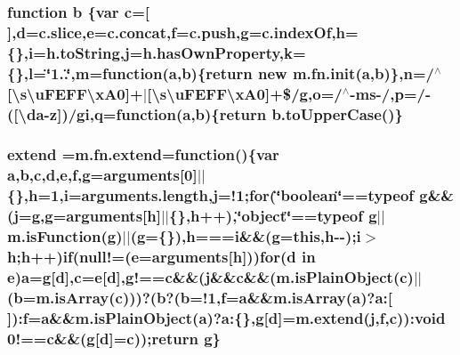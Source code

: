 \subsubsection[{b}]{\setlength{\rightskip}{0pt plus 5cm}function b \{var {\bf c}=\mbox{[}$\,$\mbox{]},{\bf d}=c.\+slice,{\bf e}=c.\+concat,f=c.\+push,g=c.\+index\+Of,h=\{\},i=h.\+to\+String,j=h.\+has\+Own\+Property,k=\{\},l=\char`\"{}1..\char`\"{},m=function({\bf a},b)\{return new m.\+fn.\+init({\bf a},b)\},{\bf n}=/$^\wedge$\mbox{[}\textbackslash{}s\textbackslash{}u\+F\+E\+F\+F\textbackslash{}x\+A0\mbox{]}+$\vert$\mbox{[}\textbackslash{}s\textbackslash{}u\+F\+E\+F\+F\textbackslash{}x\+A0\mbox{]}+\$/g,o=/$^\wedge$-\/ms-\//,p=/-\/(\mbox{[}\textbackslash{}da-\/z\mbox{]})/gi,q=function({\bf a},b)\{return b.\+to\+Upper\+Case()\}}\label{assets_2js_2jquery-1_811_82_8min_8js_ac0431efac4d7c393d1e70b86115cb93f}
\hypertarget{assets_2js_2jquery-1_811_82_8min_8js_a97d2dfc7eacd4130836f6cf8b6766d1e}{}
\subsubsection[{extend}]{\setlength{\rightskip}{0pt plus 5cm}extend =m.\+fn.\+extend=function()\{var {\bf a},{\bf b},{\bf c},{\bf d},{\bf e},f,g=arguments\mbox{[}0\mbox{]}$\vert$$\vert$\{\},h=1,i=arguments.\+length,j=!1;{\bf for}(\char`\"{}boolean\char`\"{}==typeof g\&\&(j=g,g=arguments\mbox{[}h\mbox{]}$\vert$$\vert$\{\},h++),\char`\"{}object\char`\"{}==typeof g$\vert$$\vert$m.\+is\+Function(g)$\vert$$\vert$(g=\{\}),h===i\&\&(g=this,h-\/-\/);i$>$h;h++){\bf if}(null!=({\bf e}=arguments\mbox{[}h\mbox{]})){\bf for}({\bf d} in {\bf e}){\bf a}=g\mbox{[}{\bf d}\mbox{]},{\bf c}={\bf e}\mbox{[}{\bf d}\mbox{]},g!=={\bf c}\&\&(j\&\&{\bf c}\&\&(m.\+is\+Plain\+Object({\bf c})$\vert$$\vert$({\bf b}=m.\+is\+Array({\bf c})))?({\bf b}?({\bf b}=!1,f={\bf a}\&\&m.\+is\+Array({\bf a})?a\+:\mbox{[}$\,$\mbox{]})\+:f={\bf a}\&\&m.\+is\+Plain\+Object({\bf a})?a\+:\{\},g\mbox{[}{\bf d}\mbox{]}=m.\+extend(j,f,{\bf c}))\+:void 0!=={\bf c}\&\&(g\mbox{[}{\bf d}\mbox{]}={\bf c}));return g\}}\label{assets_2js_2jquery-1_811_82_8min_8js_a97d2dfc7eacd4130836f6cf8b6766d1e}
\hypertarget{assets_2js_2jquery-1_811_82_8min_8js_ab2836ee14921cbd6e34ea91a9a99ad66}{}

